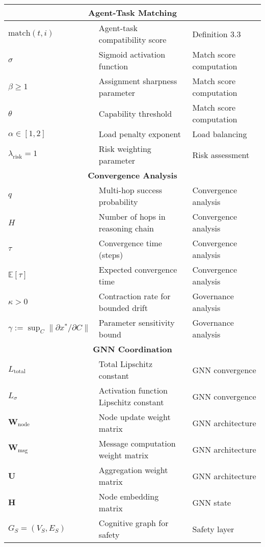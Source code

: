 \documentclass{article}
\begin{document}
\begin{longtable}{|p{2.5cm}|p{6cm}|p{3.5cm}|}
\multicolumn{3}{|c|}{\textbf{Agent-Task Matching}} \\
\hline
$\text{match}(t,i)$ & Agent-task compatibility score & Definition 3.3 \\
$\sigma$ & Sigmoid activation function & Match score computation \\
$\beta \geq 1$ & Assignment sharpness parameter & Match score computation \\
$\theta$ & Capability threshold & Match score computation \\
$\alpha \in [1,2]$ & Load penalty exponent & Load balancing \\
$\lambda_{\text{risk}} = 1$ & Risk weighting parameter & Risk assessment \\
\hline

\multicolumn{3}{|c|}{\textbf{Convergence Analysis}} \\
\hline
$q$ & Multi-hop success probability & Convergence analysis \\ 
$H$ & Number of hops in reasoning chain & Convergence analysis \\
$\tau$ & Convergence time (steps) & Convergence analysis \\
$\mathbb{E}[\tau]$ & Expected convergence time & Convergence analysis \\
$\kappa > 0$ & Contraction rate for bounded drift & Governance analysis \\
$\gamma := \sup_C \|\partial x^*/\partial C\|$ & Parameter sensitivity bound & Governance analysis \\
\hline

\multicolumn{3}{|c|}{\textbf{GNN Coordination}} \\
\hline
$L_{\text{total}}$ & Total Lipschitz constant & GNN convergence \\
$L_\sigma$ & Activation function Lipschitz constant & GNN convergence \\
$\mathbf{W}_{\text{node}}$ & Node update weight matrix & GNN architecture \\
$\mathbf{W}_{\text{msg}}$ & Message computation weight matrix & GNN architecture \\
$\mathbf{U}$ & Aggregation weight matrix & GNN architecture \\
$\mathbf{H}$ & Node embedding matrix & GNN state \\
$G_S = (V_S, E_S)$ & Cognitive graph for safety & Safety layer \\
\hline


\end{longtable}
\end{document}
